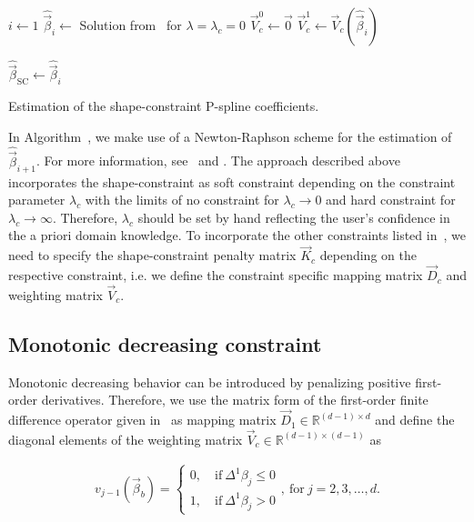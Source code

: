 \begin{algorithm}[H]
	\SetAlgoLined
	$ i \gets 1$\;
	$\hat{\vec{\beta}}_{i} \gets$ Solution from~ for $\lambda = \lambda_c = 0$\;
	$\vec{V}^0_c \gets \vec{0}$\;
	$\vec{V}^1_c \gets \vec{V}_c(\hat{\vec{\beta}}_{i})$\;

	$\hat{\vec{\beta}}_{\mathrm{SC}} \gets \hat{\vec{\beta}}_{i}$\;
	\caption{Estimation of the shape-constraint P-spline coefficients.}
	\label{alg:scp}
\end{algorithm}
%
In Algorithm~, we make use of a Newton-Raphson scheme for the estimation of $\hat{\vec{\beta}}_{i+1}$. For more information, see~ and \cite{bollaerts2006simple}. The approach described above incorporates the shape-constraint as soft constraint depending on the constraint parameter $\lambda_c$ with the limits of no constraint for $\lambda_c \rightarrow 0$ and hard constraint for $\lambda_c \rightarrow \infty$. Therefore, $\lambda_c$ should be set by hand reflecting the user's confidence in  the a priori domain knowledge. To incorporate the other constraints listed in~, we need to specify the shape-constraint  penalty matrix $\vec{K}_c$ depending on the respective constraint, i.e. we define the constraint specific mapping matrix $\vec{D}_c$ and weighting matrix $\vec{V}_c$. 

\subsection{Monotonic decreasing constraint} \label{subsec:MDC}

Monotonic decreasing behavior can be introduced by penalizing positive first-order derivatives. Therefore, we use the matrix form of the first-order finite difference operator given in~ as mapping matrix $\vec{D}_1 \in \mathbb{R}^{(d-1) \times d}$ and define the diagonal elements of the weighting matrix $\vec{V}_c \in \mathbb{R}^{(d-1) \times (d-1)}$ as

\begin{align} \label{eq:weighting-matrix-dec-diagonal}
	v_{j-1}(\vec{\beta}_b) = \begin{cases}
		0, \quad \text{if} \ \Delta^1\beta_j \le 0 \\ 
		1, \quad \text{if} \ \Delta^1\beta_j > 0
	\end{cases},	\ \text{for} \ j=2,3, \dots, d.
\end{align}


